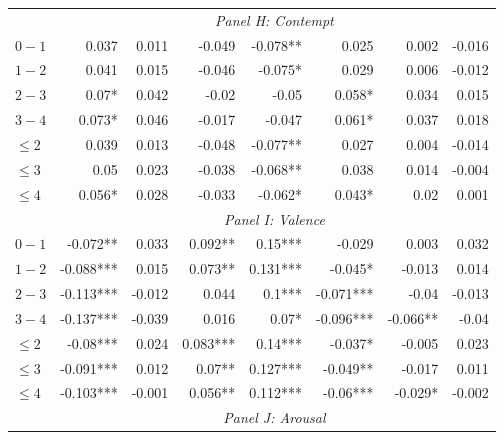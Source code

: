 \documentclass[]{article}
\begin{document}
\begin{table}[!htb]
\begin{tabular}{lrrrrrrr}
& \multicolumn{7}{c}{\emph{Panel H: Contempt}}\\ 

\cmidrule(lr){1-1} \cmidrule(lr){2-8}
$0-1$ & 0.037     & 0.011     & -0.049    & -0.078**  & 0.025     & 0.002     & -0.016    \\ 
  $1-2$ & 0.041     & 0.015     & -0.046    & -0.075*   & 0.029     & 0.006     & -0.012    \\ 
  $2-3$ & 0.07*     & 0.042     & -0.02     & -0.05     & 0.058*    & 0.034     & 0.015     \\ 
  $3-4$ & 0.073*    & 0.046     & -0.017    & -0.047    & 0.061*    & 0.037     & 0.018     \\ 
$\leq 2$ & 0.039     & 0.013     & -0.048    & -0.077**  & 0.027     & 0.004     & -0.014    \\ 
$\leq 3$ & 0.05      & 0.023     & -0.038    & -0.068**  & 0.038     & 0.014     & -0.004    \\ 
$\leq 4$ & 0.056*    & 0.028     & -0.033    & -0.062*   & 0.043*    & 0.02      & 0.001     \\ 
\cmidrule(lr){2-8} 

& \multicolumn{7}{c}{\emph{Panel I: Valence}}\\ 

\cmidrule(lr){1-1} \cmidrule(lr){2-8}
$0-1$ & -0.072**  & 0.033     & 0.092**   & 0.15***   & -0.029    & 0.003     & 0.032     \\ 
  $1-2$ & -0.088*** & 0.015     & 0.073**   & 0.131***  & -0.045*   & -0.013    & 0.014     \\ 
  $2-3$ & -0.113*** & -0.012    & 0.044     & 0.1***    & -0.071*** & -0.04     & -0.013    \\ 
  $3-4$ & -0.137*** & -0.039    & 0.016     & 0.07*     & -0.096*** & -0.066**  & -0.04     \\ 
$\leq 2$ & -0.08***  & 0.024     & 0.083***  & 0.14***   & -0.037*   & -0.005    & 0.023     \\ 
$\leq 3$ & -0.091*** & 0.012     & 0.07**    & 0.127***  & -0.049**  & -0.017    & 0.011     \\ 
$\leq 4$ & -0.103*** & -0.001    & 0.056**   & 0.112***  & -0.06***  & -0.029*   & -0.002    \\ 
\cmidrule(lr){2-8} 

& \multicolumn{7}{c}{\emph{Panel J: Arousal}}\\ 


\end{tabular}
\end{table}
\end{document}
